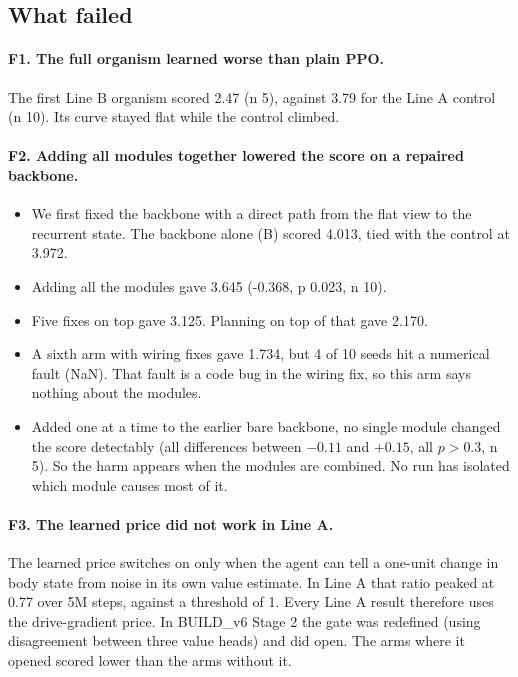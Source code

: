 \documentclass[11pt]{article}
\begin{document}
\subsection{What failed}

\paragraph{F1. The full organism learned worse than plain PPO.}
The first Line B organism scored 2.47 (n 5), against 3.79 for the Line A control (n 10). Its curve stayed flat while the control climbed.

\paragraph{F2. Adding all modules together lowered the score on a repaired backbone.}

\begin{itemize}
\item We first fixed the backbone with a direct path from the flat view to the recurrent state. The backbone alone (B) scored 4.013, tied with the control at 3.972.
\item Adding all the modules gave 3.645 (-0.368, p 0.023, n 10).
\item Five fixes on top gave 3.125. Planning on top of that gave 2.170.
\item A sixth arm with wiring fixes gave 1.734, but 4 of 10 seeds hit a numerical fault (NaN). That fault is a code bug in the wiring fix, so this arm says nothing about the modules.
\item Added one at a time to the earlier bare backbone, no single module changed the score detectably (all differences between $-0.11$ and $+0.15$, all $p > 0.3$, n 5). So the harm appears when the modules are combined. No run has isolated which module causes most of it.
\end{itemize}

\paragraph{F3. The learned price did not work in Line A.}
The learned price switches on only when the agent can tell a one-unit change in body state from noise in its own value estimate. In Line A that ratio peaked at 0.77 over 5M steps, against a threshold of 1. Every Line A result therefore uses the drive-gradient price. In BUILD\_v6 Stage 2 the gate was redefined (using disagreement between three value heads) and did open. The arms where it opened scored lower than the arms without it.
\end{document}
